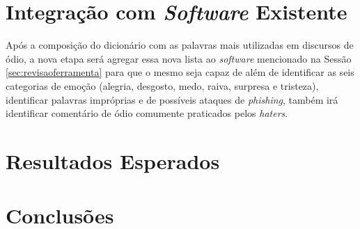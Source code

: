 \section{Integração com \textit{Software} Existente}
Após a composição do dicionário com as palavras mais utilizadas em discursos de ódio, a nova etapa será agregar essa nova lista ao \textit{software} mencionado na Sessão \ref{sec:revisaoferramenta} para que o mesmo seja capaz de além de identificar as seis categorias de emoção (alegria, desgosto, medo, raiva, surpresa e tristeza), identificar palavras impróprias e de possíveis ataques de \textit{phishing}, também irá identificar comentário de ódio comumente praticados pelos \textit{haters}.


\section{Resultados Esperados}
\section{Conclusões}

